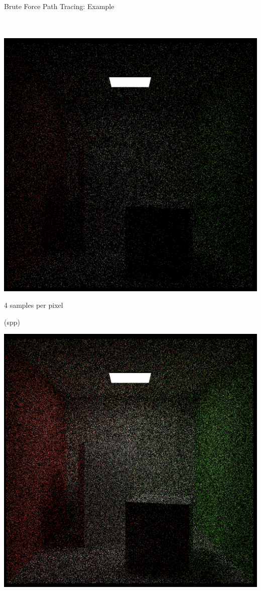 \documentclass[utf8,stillsansserifmath,fleqn,t]{beamer}
\begin{document}
\begin{frame}
\frametitle{\insertsection}
Brute Force Path Tracing: Example\\
~\\
~\\
\begin{minipage}[t]{.33\textwidth}
\includegraphics[width=\textwidth]{./fig/cornellbox-bruteforce-4spp.png}
\centerline{4 samples per pixel}
\centerline{(spp)}
\end{minipage}\hfill
\begin{minipage}[t]{.33\textwidth}
\includegraphics[width=\textwidth]{./fig/cornellbox-bruteforce-16spp.png}

\end{minipage}
\end{frame}
\end{document}
